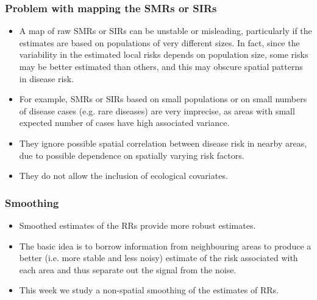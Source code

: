 \documentclass[12pt]{beamer}
\begin{document}
\begin{frame}
\frametitle{Problem with mapping the SMRs or SIRs}
\small{
\begin{itemize} \setlength\itemsep{\fill}
  \item A map of raw SMRs or SIRs can be unstable or misleading, particularly if the estimates are based on populations of very different sizes. In fact, since the variability in the estimated local risks depends on population size, some risks may be better estimated than others, and this may obscure spatial patterns in disease risk.
\item For example, SMRs or SIRs based on small populations or on small numbers of disease cases (e.g. rare diseases) are very imprecise, as areas with small expected number of cases have high associated variance.
\item They ignore possible spatial correlation between disease risk in nearby areas, due to possible dependence on spatially varying risk factors. %
\item They do not allow the inclusion of ecological covariates. %

\end{itemize}
}
\end{frame}


\begin{frame}
\frametitle{Smoothing}
\begin{itemize} \setlength\itemsep{\fill}
\item \alert{Smoothed} estimates of the RRs provide more robust estimates. 
\item The basic idea is to \alert{borrow information} from neighbouring areas to produce a better (i.e. more stable and less noisy) estimate of the risk associated with each area and thus separate out the signal from the noise.
\item This week we study a non-spatial smoothing of the estimates of RRs.
\end{itemize}
\end{frame}
\end{document}
